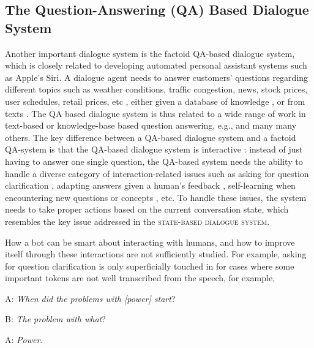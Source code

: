 \subsection{The Question-Answering (QA) Based Dialogue System}
Another important dialogue system is the 
 factoid QA-based dialogue system, 
which is closely related to developing automated personal assistant systems such as Apple's Siri. 
A dialogue agent needs to answer customers' questions regarding different topics 
such as weather conditions, traffic congestion, news, stock prices, user schedules, retail prices, etc \cite{d1993personal,modi2005cmradar,myers2007intelligent,berry2011ptime}, either given a database of knowledge \cite{dodge2015evaluating,bordes2015large,weston2016dialog},
or from  texts \cite{hermann2015teaching,weston2015towards,weston2016dialog}.
The QA based dialogue system is thus related to a wide range of work in text-based or knowledge-base based question answering, e.g., \cite{hirschman2001natural,clarke2003passage,maybury2008new,berant2013semantic,iyyer2014neural,rajpurkar2016squad}  and many many others. 
The key difference between a QA-based dialogue system and a factoid QA-system is that 
the QA-based dialogue system is interactive \cite{rieser2009does}: instead of just having to answer one single question, 
the QA-based system needs the ability to handle a diverse category of interaction-related issues such as 
 asking for question clarification \cite{stoyanchev2013modelling,stoyanchev2014towards}, adapting answers given 
a human's feedback \cite{rieser2009does}, 
self-learning when encountering new questions or concepts
\cite{purver2006clarie}, etc.
To handle these issues, 
 the system needs to 
 take proper  actions based on the current conversation state, which resembles the key issue addressed in the \textsc{state-based dialogue system}. 

How a bot can 
be smart about interacting with humans, 
and how to improve itself through these interactions are not sufficiently studied. 
For example, asking for question clarification is only superficially touched in 
 for cases where some important tokens are not well transcribed from the speech, for example,

A: {\it When did the problems with [power] start}?

B: {\it The problem with what}?

A: {\it Power}.

